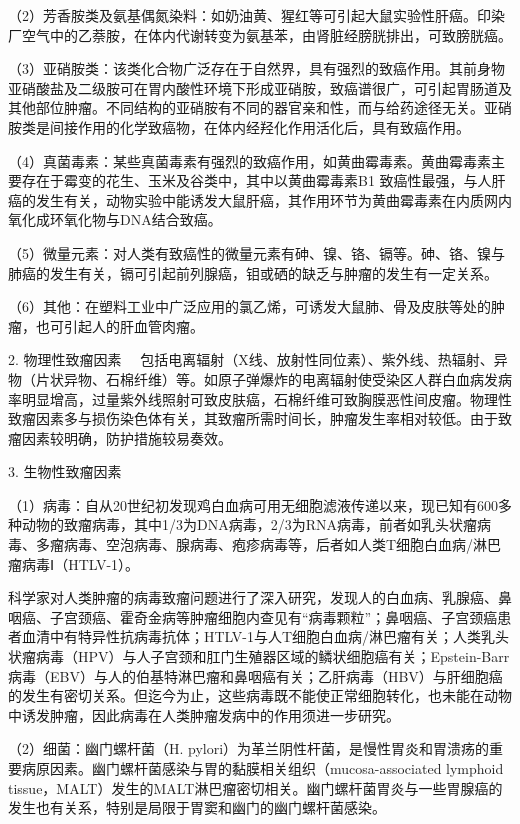 （2）芳香胺类及氨基偶氮染料：如奶油黄、猩红等可引起大鼠实验性肝癌。印染厂空气中的乙萘胺，在体内代谢转变为氨基苯，由肾脏经膀胱排出，可致膀胱癌。

（3）亚硝胺类：该类化合物广泛存在于自然界，具有强烈的致癌作用。其前身物亚硝酸盐及二级胺可在胃内酸性环境下形成亚硝胺，致癌谱很广，可引起胃肠道及其他部位肿瘤。不同结构的亚硝胺有不同的器官亲和性，而与给药途径无关。亚硝胺类是间接作用的化学致癌物，在体内经羟化作用活化后，具有致癌作用。

（4）真菌毒素：某些真菌毒素有强烈的致癌作用，如黄曲霉毒素。黄曲霉毒素主要存在于霉变的花生、玉米及谷类中，其中以黄曲霉毒素B{1}
致癌性最强，与人肝癌的发生有关，动物实验中能诱发大鼠肝癌，其作用环节为黄曲霉毒素在内质网内氧化成环氧化物与DNA结合致癌。

（5）微量元素：对人类有致癌性的微量元素有砷、镍、铬、镉等。砷、铬、镍与肺癌的发生有关，镉可引起前列腺癌，钼或硒的缺乏与肿瘤的发生有一定关系。

（6）其他：在塑料工业中广泛应用的氯乙烯，可诱发大鼠肺、骨及皮肤等处的肿瘤，也可引起人的肝血管肉瘤。

{2. 物理性致瘤因素}
　包括电离辐射（X线、放射性同位素）、紫外线、热辐射、异物（片状异物、石棉纤维）等。如原子弹爆炸的电离辐射使受染区人群白血病发病率明显增高，过量紫外线照射可致皮肤癌，石棉纤维可致胸膜恶性间皮瘤。物理性致瘤因素多与损伤染色体有关，其致瘤所需时间长，肿瘤发生率相对较低。由于致瘤因素较明确，防护措施较易奏效。

{3. 生物性致瘤因素}

（1）病毒：自从20世纪初发现鸡白血病可用无细胞滤液传递以来，现已知有600多种动物的致瘤病毒，其中1/3为DNA病毒，2/3为RNA病毒，前者如乳头状瘤病毒、多瘤病毒、空泡病毒、腺病毒、疱疹病毒等，后者如人类T细胞白血病/淋巴瘤病毒Ⅰ（HTLV-1）。

科学家对人类肿瘤的病毒致瘤问题进行了深入研究，发现人的白血病、乳腺癌、鼻咽癌、子宫颈癌、霍奇金病等肿瘤细胞内查见有“病毒颗粒”；鼻咽癌、子宫颈癌患者血清中有特异性抗病毒抗体；HTLV-1与人T细胞白血病/淋巴瘤有关；人类乳头状瘤病毒（HPV）与人子宫颈和肛门生殖器区域的鳞状细胞癌有关；Epstein-Barr病毒（EBV）与人的伯基特淋巴瘤和鼻咽癌有关；乙肝病毒（HBV）与肝细胞癌的发生有密切关系。但迄今为止，这些病毒既不能使正常细胞转化，也未能在动物中诱发肿瘤，因此病毒在人类肿瘤发病中的作用须进一步研究。

（2）细菌：幽门螺杆菌（H.
pylori）为革兰阴性杆菌，是慢性胃炎和胃溃疡的重要病原因素。幽门螺杆菌感染与胃的黏膜相关组织（mucosa-associated
lymphoid
tissue，MALT）发生的MALT淋巴瘤密切相关。幽门螺杆菌胃炎与一些胃腺癌的发生也有关系，特别是局限于胃窦和幽门的幽门螺杆菌感染。

